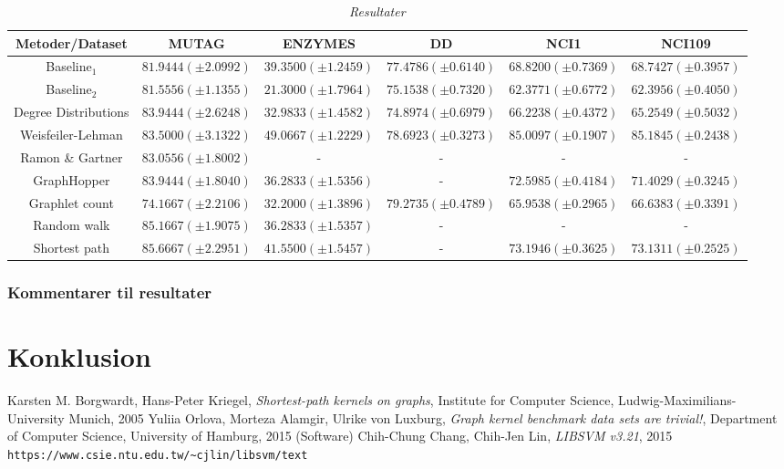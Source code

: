 \documentclass{article}
\begin{document}
\begin{table}[H]
\begin{center}
\scalebox{0.7} {
\begin{tabular}{c|c|c|c|c|c}
Metoder/Dataset & MUTAG & ENZYMES & DD & NCI1 & NCI109 \\
\hline
Baseline$_1$ & \boldmath$81.9444(\pm 2.0992)$ & $39.3500(\pm 1.2459)$ & $77.4786(\pm 0.6140)$ & $68.8200(\pm 0.7369)$ & $68.7427(\pm 0.3957)$ \\
Baseline$_2$ & $81.5556 (\pm 1.1355)$ & $21.3000 (\pm 1.7964)$ & $75.1538 (\pm 0.7320)$ & $62.3771 (\pm 0.6772)$ & $62.3956 (\pm 0.4050)$ \\
Degree Distributions &\boldmath$83.9444 (\pm 2.6248)$ &  $32.9833 (\pm 1.4582)$ & $74.8974 (\pm 0.6979)$ & $66.2238 (\pm 0.4372)$ & $65.2549 (\pm 0.5032)$ \\
Weisfeiler-Lehman & \boldmath$83.5000 (\pm 3.1322)$ & \boldmath$49.0667 (\pm 1.2229)$ & \boldmath$78.6923 (\pm 0.3273)$ & \boldmath$85.0097 (\pm 0.1907)$ & \boldmath$85.1845 (\pm 0.2438)$ \\
Ramon \& Gartner & \boldmath$83.0556 (\pm 1.8002)$ & - & - & - & - \\
GraphHopper & \boldmath$83.9444 (\pm 1.8040)$ & $36.2833 (\pm 1.5356)$ & - & $72.5985 (\pm 0.4184)$ & $71.4029 (\pm 0.3245)$ \\
Graphlet count & $74.1667 (\pm 2.2106)$ & $32.2000 (\pm 1.3896)$ & \boldmath$79.2735 (\pm 0.4789)$ & $65.9538 (\pm 0.2965)$ & $66.6383 (\pm 0.3391)$ \\
Random walk & $85.1667 (\pm 1.9075)$ & $36.2833 (\pm 1.5357)$ & - & - & - \\
Shortest path & \boldmath$85.6667 (\pm 2.2951)$ & $41.5500 (\pm 1.5457)$ & - & $73.1946 (\pm 0.3625)$ & $73.1311 (\pm 0.2525)$ \\
\end{tabular}
}
\caption{\textit{Resultater}}

\end{center}
\end{table}


\subsubsection{Kommentarer til resultater}

\section{Konklusion}



\renewcommand\refname{Referencer}
\begin{thebibliography}{9}
	Karsten M. Borgwardt, Hans-Peter Kriegel, 
	\emph{Shortest-path kernels on graphs},
	Institute for Computer Science, Ludwig-Maximilians-University Munich, 2005
	Yuliia Orlova, Morteza Alamgir, Ulrike von Luxburg, \textit{Graph kernel benchmark data sets are trivial!}, Department of Computer Science, University of Hamburg, 2015
	(Software) Chih-Chung Chang, Chih-Jen Lin, \textit{LIBSVM v3.21}, 2015\\ \verb|https://www.csie.ntu.edu.tw/~cjlin/libsvm/text|
\end{thebibliography}
\end{document}
